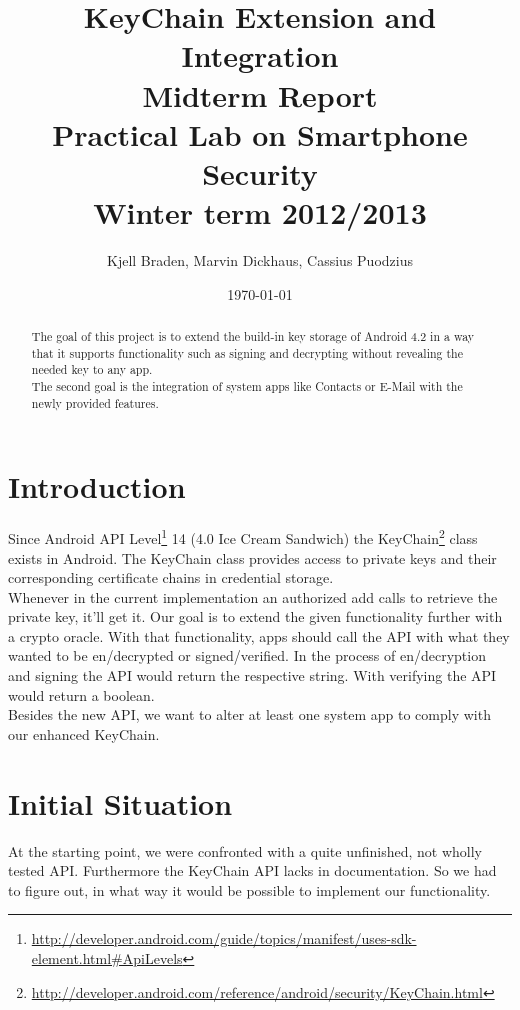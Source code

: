 \documentclass[a4paper]{scrartcl}
\title{KeyChain Extension and Integration\\
	Midterm Report\\[4mm]
  \small{Practical Lab on Smartphone Security\\[2mm]
  Winter term 2012/2013}}
\author{Kjell Braden, Marvin Dickhaus, Cassius Puodzius}
\date{\today}
\begin{document}
\maketitle

\begin{abstract}
	The goal of this project is to extend the build-in key storage of Android 4.2 in a way that it supports functionality such as signing and decrypting without revealing the needed key to any app.\\
	The second goal is the integration of system apps like Contacts or E-Mail with the newly provided features.
\end{abstract}

\tableofcontents

\section{Introduction}
	Since Android API Level\footnote{\url{http://developer.android.com/guide/topics/manifest/uses-sdk-element.html\#ApiLevels}} 14 (4.0 Ice Cream Sandwich) the KeyChain\footnote{\url{http://developer.android.com/reference/android/security/KeyChain.html}} class exists in Android. The KeyChain class provides access to private keys and their corresponding certificate chains in credential storage.\\
	Whenever in the current implementation an authorized add calls to retrieve the private key, it'll get it. Our goal is to extend the given functionality further with a crypto oracle. With that functionality, apps should call the API with what they wanted to be en/decrypted or signed/verified. In the process of en/decryption and signing the API would return the respective string. With verifying the API would return a boolean.\\
	Besides the new API, we want to alter at least one system app to comply with our enhanced KeyChain.

\section{Initial Situation}
	At the starting point, we were confronted with a quite unfinished, not wholly tested API. Furthermore the KeyChain API lacks in documentation. So we had to figure out, in what way it would be possible to implement our functionality.
\end{document}
